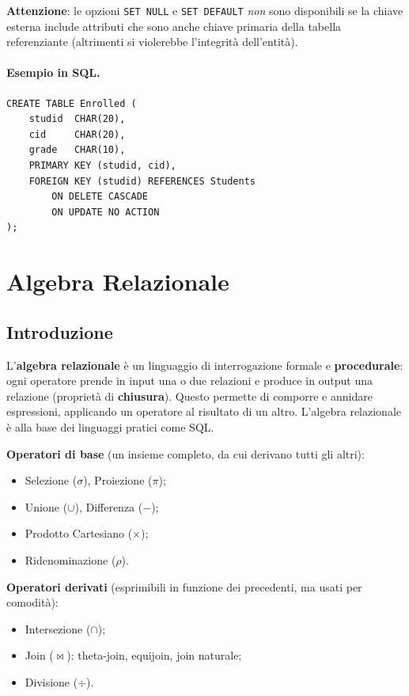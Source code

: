 \documentclass[12pt, a4paper]{article}
\begin{document}
\textbf{Attenzione}: le opzioni \texttt{SET NULL} e \texttt{SET DEFAULT} \emph{non} sono disponibili se la chiave esterna include attributi che sono anche chiave primaria della tabella referenziante (altrimenti si violerebbe l'integrità dell'entità).

\paragraph{Esempio in SQL.}
\begin{verbatim}
CREATE TABLE Enrolled (
    studid  CHAR(20),
    cid     CHAR(20),
    grade   CHAR(10),
    PRIMARY KEY (studid, cid),
    FOREIGN KEY (studid) REFERENCES Students
        ON DELETE CASCADE
        ON UPDATE NO ACTION
);
\end{verbatim}



\section{Algebra Relazionale}

\subsection{Introduzione}

L'\textcolor{tocsec}{\textbf{algebra relazionale}} è un linguaggio di interrogazione formale e \textbf{procedurale}: ogni operatore prende in input una o due relazioni e produce in output una relazione (proprietà di \textbf{chiusura}). Questo permette di comporre e annidare espressioni, applicando un operatore al risultato di un altro. L'algebra relazionale è alla base dei linguaggi pratici come SQL.

\textbf{Operatori di base} (un insieme completo, da cui derivano tutti gli altri):
\begin{itemize}
    \item Selezione ($\sigma$), Proiezione ($\pi$);
    \item Unione ($\cup$), Differenza ($-$);
    \item Prodotto Cartesiano ($\times$);
    \item Ridenominazione ($\rho$).
\end{itemize}

\textbf{Operatori derivati} (esprimibili in funzione dei precedenti, ma usati per comodità):
\begin{itemize}
    \item Intersezione ($\cap$);
    \item Join ($\bowtie$): theta-join, equijoin, join naturale;
    \item Divisione ($\div$).
\end{itemize}
\end{document}
